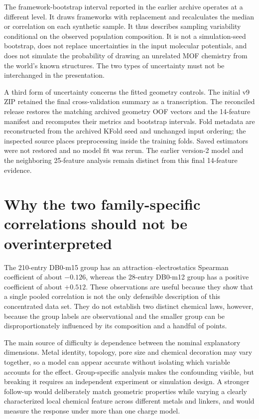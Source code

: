 \documentclass[11pt,a4paper]{article}
\begin{document}
The framework-bootstrap interval reported in the earlier archive operates at a different level. It draws frameworks with replacement and recalculates the median or correlation on each synthetic sample. It thus describes sampling variability conditional on the observed population composition. It is not a simulation-seed bootstrap, does not replace uncertainties in the input molecular potentials, and does not simulate the probability of drawing an unrelated MOF chemistry from the world's known structures. The two types of uncertainty must not be interchanged in the presentation.

A third form of uncertainty concerns the fitted geometry controls. The initial v9 ZIP retained the final cross-validation summary as a transcription. The reconciled release restores the matching archived geometry OOF vectors and the 14-feature manifest and recomputes their metrics and bootstrap intervals. Fold metadata are reconstructed from the archived KFold seed and unchanged input ordering; the inspected source places preprocessing inside the training folds. Saved estimators were not restored and no model fit was rerun. The earlier version-2 model and the neighboring 25-feature analysis remain distinct from this final 14-feature evidence.

\section{Why the two family-specific correlations should not be overinterpreted}

The 210-entry DB0-m15 group has an attraction--electrostatics Spearman coefficient of about $-0.126$, whereas the 28-entry DB0-m12 group has a positive coefficient of about $+0.512$. These observations are useful because they show that a single pooled correlation is not the only defensible description of this concentrated data set. They do not establish two distinct chemical laws, however, because the group labels are observational and the smaller group can be disproportionately influenced by its composition and a handful of points.

The main source of difficulty is dependence between the nominal explanatory dimensions. Metal identity, topology, pore size and chemical decoration may vary together, so a model can appear accurate without isolating which variable accounts for the effect. Group-specific analysis makes the confounding visible, but breaking it requires an independent experiment or simulation design. A stronger follow-up would deliberately match geometric properties while varying a clearly characterized local chemical feature across different metals and linkers, and would measure the response under more than one charge model.
\end{document}
